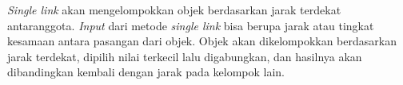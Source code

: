 \textit{Single link} akan mengelompokkan objek berdasarkan jarak terdekat antaranggota. \textit{Input} dari metode \textit{single link} bisa berupa jarak atau tingkat kesamaan antara pasangan dari objek. Objek akan dikelompokkan berdasarkan jarak terdekat, dipilih nilai terkecil lalu digabungkan, dan hasilnya akan dibandingkan kembali dengan jarak pada kelompok lain.


